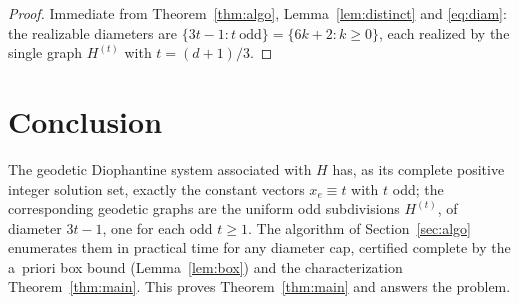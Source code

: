 \documentclass{amsart}
\theoremstyle{plain}
\theoremstyle{definition}
\begin{document}
\begin{proof}
Immediate from Theorem~\ref{thm:algo}, Lemma~\ref{lem:distinct} and \eqref{eq:diam}:
the realizable diameters are $\{3t-1:t\ \text{odd}\}=\{6k+2:k\ge0\}$, each realized by
the single graph $H^{(t)}$ with $t=(d+1)/3$.
\end{proof}

\section{Conclusion}

The geodetic Diophantine system associated with $H$ has, as its complete positive
integer solution set, exactly the constant vectors $x_e\equiv t$ with $t$ odd; the
corresponding geodetic graphs are the uniform odd subdivisions $H^{(t)}$, of diameter
$3t-1$, one for each odd $t\ge1$. The algorithm of Section~\ref{sec:algo} enumerates
them in practical time for any diameter cap, certified complete by the a~priori box
bound (Lemma~\ref{lem:box}) and the characterization Theorem~\ref{thm:main}. This
proves Theorem~\ref{thm:main} and answers the problem.
\end{document}
